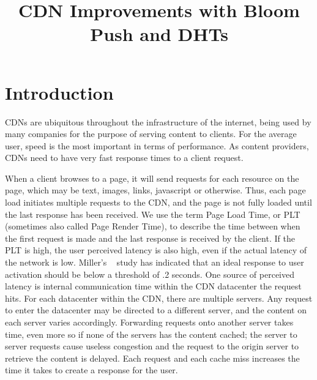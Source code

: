 \documentclass[conference]{IEEEtran}
\begin{document}
\title{CDN Improvements with Bloom Push and DHTs}

\author{
	\and
}

\maketitle
\thispagestyle{plain}
\pagestyle{plain}

\section{Introduction}\label{sec:intro}
CDNs are ubiquitous throughout the infrastructure of the internet, being used by many companies for the purpose of serving content to clients. For the average user, speed is the most important in terms of performance. As content providers, CDNs need to have very fast response times to a client request.

When a client browses to a page, it will send requests for each resource on the page, which may be text, images, links, javascript or otherwise. Thus, each page load initiates multiple requests to the CDN, and the page is not fully loaded until the last response has been received. We use the term Page Load Time, or PLT (sometimes also called Page Render Time), to describe the time between when the first request is made and the last response is received by the client. If the PLT is high, the user perceived latency is also high, even if the actual latency of the network is low. Miller’s ~\cite{MillerResponseTime} study has indicated that an ideal response to user activation should be below a threshold of .2 seconds. One source of perceived latency is internal communication time within the CDN datacenter the request hits. 
For each datacenter within the CDN, there are multiple servers. Any request to enter the datacenter may be directed to a different server, and the content on each server varies accordingly. Forwarding requests onto another server takes time, even more so if none of the servers has the content cached; the server to server requests cause useless congestion and the request to the origin server to retrieve the content is delayed. Each request and each cache miss increases the time it takes to create a response for the user. 
\end{document}
